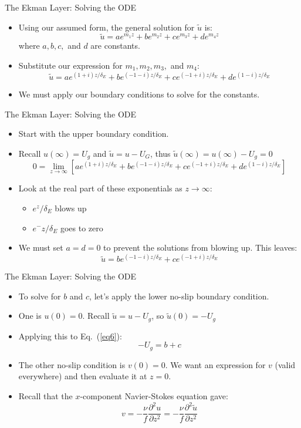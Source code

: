 \begin{frame}{The Ekman Layer: Solving the ODE}

\begin{itemize}
	\item Using our assumed form, the general solution for $\tilde u$ is:
	$$\tilde u = ae^{m_1 z} + be^{m_2 z} + ce^{m_3 z} + de^{m_4 z}$$
	where $a,b,c,$ and $d$ are constants.
	\item Substitute our expression for $m_1, m_2, m_3,$ and $m_4$:
	$$\tilde u = ae^{(1+i)z/\delta_E} + be^{(-1-i)z/\delta_E} + ce^{(-1+i)z/\delta_E} + de^{(1-i)z/\delta_E}$$
	\item We must apply our boundary conditions to solve for the constants.
\end{itemize}
\end{frame}
\begin{frame}{The Ekman Layer: Solving the ODE}

\begin{itemize}
	\item Start with the upper boundary condition. 
	\item Recall $u(\infty) = U_g$ and $\tilde u = u-U_G$, thus $\tilde u (\infty) = u(\infty) -U_g = 0$
	$$0 = \lim_{z\rightarrow \infty} \left[ ae^{(1+i)z/\delta_E} + be^{(-1-i)z/\delta_E} + ce^{(-1+i)z/\delta_E} + de^{(1-i)z/\delta_E}\right]$$
	\item Look at the real part of these exponentials as $z\rightarrow \infty$:
	\begin{itemize}
		\item $e^z/\delta_E$ blows up
		\item $e^-z/\delta_E$ goes to zero
	\end{itemize}
	\item We must set $a=d=0$ to prevent the solutions from blowing up. This leaves:
	\begin{equation}
		\tilde u = be^{(-1-i)z/\delta_E} + ce^{(-1+i)z/\delta_E}
		\label{eq6}
	\end{equation}
\end{itemize}
\end{frame}
\begin{frame}{The Ekman Layer: Solving the ODE}

\begin{itemize}
	\item To solve for $b$ and $c$, let's apply the lower no-slip boundary condition.
	\item One is $u(0) = 0$. Recall $\tilde u = u - U_g$, so $\tilde u(0) = -U_g$
	\item Applying this to Eq.~(\ref{eq6}):
	$$-U_g = b + c$$
	\item The other no-slip condition is $v(0)=0$. We want an expression for $v$ (valid everywhere) and then evaluate it at $z=0$.
	\item Recall that the $x$-component Navier-Stokes equation gave:
	$$v = -\frac{\nu}{f}\frac{\partial^2 u}{\partial z^2} = -\frac{\nu}{f}\frac{\partial^2 \tilde u}{\partial z^2}$$
\end{itemize}
\end{frame}
